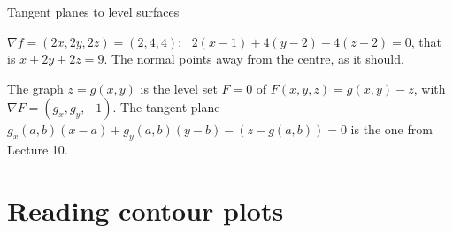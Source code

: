 \documentclass[10pt]{wosm-slides}
\begin{document}
\begin{frame}{Tangent planes to level surfaces}
  \begin{example}[Sphere $x^2 + y^2 + z^2 = 9$ at $(1, 2, 2)$]
    $\nabla f = (2x, 2y, 2z) = (2, 4, 4)$: \ $2(x - 1) + 4(y - 2) + 4(z - 2) = 0$, that is
    $x + 2y + 2z = 9$. The normal points away from the centre, as it should.
  \end{example}
  \pause
  \begin{example}
    The graph $z = g(x, y)$ is the level set $F = 0$ of $F(x, y, z) = g(x, y) - z$, with
    $\nabla F = (g_x, g_y, -1)$. The tangent plane
    $g_x(a, b)(x - a) + g_y(a, b)(y - b) - (z - g(a, b)) = 0$ is the one from Lecture 10.
  \end{example}
\end{frame}

\section{Reading contour plots}
\end{document}
